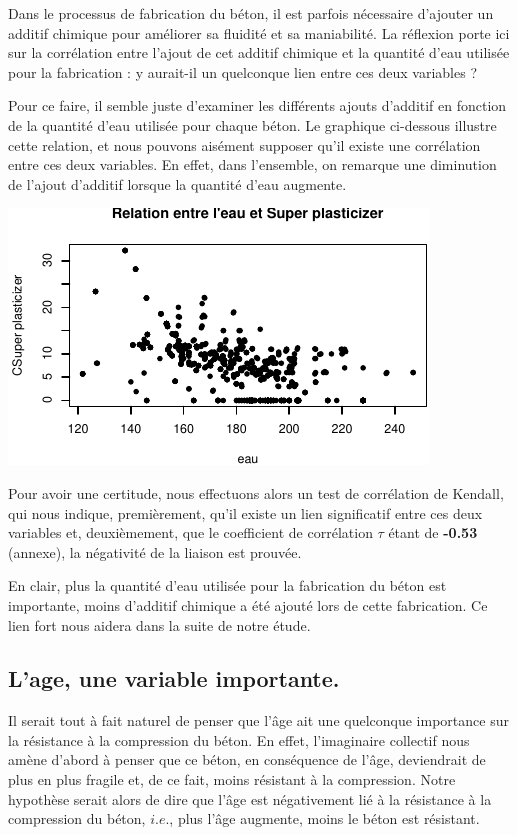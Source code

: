 \documentclass[
  12pt,
]{article}
\begin{document}
Dans le processus de fabrication du béton, il est parfois nécessaire
d'ajouter un additif chimique pour améliorer sa fluidité et sa
maniabilité. La réflexion porte ici sur la corrélation entre l'ajout de
cet additif chimique et la quantité d'eau utilisée pour la fabrication :
y aurait-il un quelconque lien entre ces deux variables ?

Pour ce faire, il semble juste d'examiner les différents ajouts
d'additif en fonction de la quantité d'eau utilisée pour chaque béton.
Le graphique ci-dessous illustre cette relation, et nous pouvons
aisément supposer qu'il existe une corrélation entre ces deux variables.
En effet, dans l'ensemble, on remarque une diminution de l'ajout
d'additif lorsque la quantité d'eau augmente.

\begin{center}\includegraphics{rmd_final_files/figure-latex/unnamed-chunk-3-1} \end{center}

Pour avoir une certitude, nous effectuons alors un test de corrélation
de Kendall, qui nous indique, premièrement, qu'il existe un lien
significatif entre ces deux variables et, deuxièmement, que le
coefficient de corrélation \(\tau\) étant de \textbf{-0.53} (annexe), la
négativité de la liaison est prouvée.

En clair, plus la quantité d'eau utilisée pour la fabrication du béton
est importante, moins d'additif chimique a été ajouté lors de cette
fabrication. Ce lien fort nous aidera dans la suite de notre étude.

\subsection{L'age, une variable
importante.}\label{lage-une-variable-importante.}

Il serait tout à fait naturel de penser que l'âge ait une quelconque
importance sur la résistance à la compression du béton. En effet,
l'imaginaire collectif nous amène d'abord à penser que ce béton, en
conséquence de l'âge, deviendrait de plus en plus fragile et, de ce
fait, moins résistant à la compression. Notre hypothèse serait alors de
dire que l'âge est négativement lié à la résistance à la compression du
béton, \(i.e.\), plus l'âge augmente, moins le béton est résistant.
\end{document}
